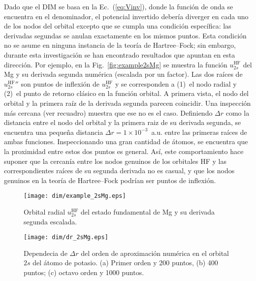 Dado que el DIM se basa en la Ec.~(\ref{eq:Vinv}), donde la función de 
onda se encuentra en el denominador, el potencial invertido debería 
diverger en cada uno de los nodos del orbital excepto que se cumpla una 
condición específica: las derivadas segundas se anulan exactamente en 
los mismos puntos. Esta condición no se asume en ninguna instancia de la 
teoría de Hartree--Fock; sin embargo, durante esta investigación se han 
encontrado resultados que apuntan en esta dirección. Por ejemplo, en 
la Fig.~\ref{fig:example2sMg} se muestra la función 
$u_{2s}^{\mathrm{HF}}$ del Mg y su derivada segunda numérica (escalada 
por un factor). Las dos raíces de $u_{2s}^{\mathrm{HF}}''$ son puntos de 
inflexión de $u_{2s}^{\mathrm{HF}}$ y se corresponden a (1)~el nodo 
radial y (2)~el punto de retorno clásico en la función orbital. A 
primera vista, el nodo del orbital y la primera raíz de la derivada 
segunda parecen coincidir. Una inspección más cercana (ver recuadro) 
muestra que ese no es el caso. Definiendo $\Delta r$ como la distancia 
entre el nodo del orbital y la primera raiz de su derivada segunda, se 
encuentra una pequeña distancia $\Delta r=1\times 10^{-3}$~a.u. entre 
las primeras raíces de ambas funciones. Inspeccionando una gran cantidad 
de átomos, se encuentra que la proximidad entre estos dos puntos es 
general. Así, este comportamiento hace suponer que la cercanía entre los 
nodos genuinos de los orbitales HF y las correspondientes raíces de su 
segunda derivada no es casual, y que los nodos genuinos en la teoría de 
Hartree--Fock podrían ser puntos de inflexión. 

\begin{figure}
\centering
\vspace{-0.45cm}
\texttt{[image: dim/example\_2sMg.eps]} 
\vspace{-0.45cm}
\caption[Orbital radial y su derivada segunda.]
{Orbital radial $u_{2s}^{\mathrm{HF}}$ del estado fundamental de Mg y su 
derivada segunda escalada.}
\label{fig:example2sMg}

\vspace{0.25cm}
\texttt{[image: dim/dr\_2sMg.eps]} 
\vspace{-0.45cm}
\caption[Dependecia de $\Delta r$ del orden de aproximación numérica.]
{Dependecia de $\Delta r$ del orden de aproximación numérica en el 
orbital $2s$ del átomo de potasio. (a) Primer orden y 200 puntos, (b) 
400 puntos; (c) octavo orden y 1000 puntos.}
\label{fig:dr2sMg}
\end{figure}


